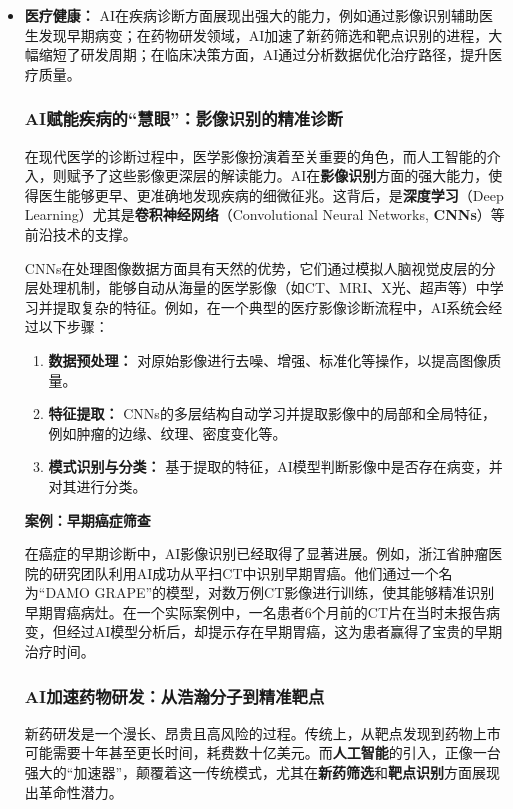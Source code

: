 \begin{itemize}
    \item \textbf{医疗健康：} AI在疾病诊断方面展现出强大的能力，例如通过影像识别辅助医生发现早期病变；在药物研发领域，AI加速了新药筛选和靶点识别的进程，大幅缩短了研发周期；在临床决策方面，AI通过分析数据优化治疗路径，提升医疗质量。

    \subsubsection{AI赋能疾病的“慧眼”：影像识别的精准诊断}
    在现代医学的诊断过程中，医学影像扮演着至关重要的角色，而人工智能的介入，则赋予了这些影像更深层的解读能力。AI在\textbf{影像识别}方面的强大能力，使得医生能够更早、更准确地发现疾病的细微征兆。这背后，是\textbf{深度学习}（Deep Learning）尤其是\textbf{卷积神经网络}（Convolutional Neural Networks, \textbf{CNNs}）等前沿技术的支撑。

    CNNs在处理图像数据方面具有天然的优势，它们通过模拟人脑视觉皮层的分层处理机制，能够自动从海量的医学影像（如CT、MRI、X光、超声等）中学习并提取复杂的特征。例如，在一个典型的医疗影像诊断流程中，AI系统会经过以下步骤：
    \begin{enumerate}
        \item \textbf{数据预处理：} 对原始影像进行去噪、增强、标准化等操作，以提高图像质量。
        \item \textbf{特征提取：} CNNs的多层结构自动学习并提取影像中的局部和全局特征，例如肿瘤的边缘、纹理、密度变化等。
        \item \textbf{模式识别与分类：} 基于提取的特征，AI模型判断影像中是否存在病变，并对其进行分类。
    \end{enumerate}

    \textbf{案例：早期癌症筛查}

    在癌症的早期诊断中，AI影像识别已经取得了显著进展。例如，浙江省肿瘤医院的研究团队利用AI成功从平扫CT中识别早期胃癌。他们通过一个名为“DAMO GRAPE”的模型，对数万例CT影像进行训练，使其能够精准识别早期胃癌病灶。在一个实际案例中，一名患者6个月前的CT片在当时未报告病变，但经过AI模型分析后，却提示存在早期胃癌，这为患者赢得了宝贵的早期治疗时间。

    \subsubsection{AI加速药物研发：从浩瀚分子到精准靶点}
    新药研发是一个漫长、昂贵且高风险的过程。传统上，从靶点发现到药物上市可能需要十年甚至更长时间，耗费数十亿美元。而\textbf{人工智能}的引入，正像一台强大的“加速器”，颠覆着这一传统模式，尤其在\textbf{新药筛选}和\textbf{靶点识别}方面展现出革命性潜力。


\end{itemize}
